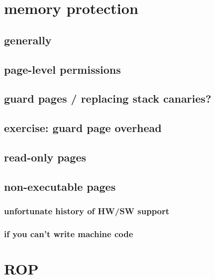 \section{memory protection}
\subsection{generally}


\subsection{page-level permissions}


\subsection{guard pages / replacing stack canaries?}


\subsection{exercise: guard page overhead}


\subsection{read-only pages}


\subsection{non-executable pages}


\subsubsection{unfortunate history of HW/SW support}


\subsubsection{if you can't write machine code}


\section{ROP}


